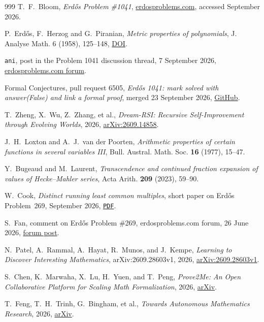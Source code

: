 \documentclass[10pt]{article}
\newcommand{\repobase}{https://github.com/wcook04/plectis-erdos}
\newcommand{\repolink}[2]{\href{\repobase/blob/992cf60a27efd8c34f437e347c413bb781d75c32/#1}{\texttt{#2}}}
\begin{document}
\begin{thebibliography}{999}
 T.~F.~Bloom, \emph{Erd\H{o}s Problem \#1041},
\href{https://www.erdosproblems.com/1041}{erdosproblems.com}, accessed
September 2026.

 P.~Erd\H{o}s, F.~Herzog and G.~Piranian, \emph{Metric
properties of polynomials}, J. Analyse Math. 6 (1958), 125--148,
\href{https://doi.org/10.1007/BF02790232}{DOI}.

 \texttt{ani}, post in the Problem 1041 discussion thread,
7 September 2026,
\href{https://www.erdosproblems.com/forum/thread/1041\#post-8861}{erdosproblems.com forum}.

 Formal Conjectures, pull request 6505, \emph{Erd\H{o}s 1041:
mark solved with answer(False) and link a formal proof}, merged 23 September
2026, \href{https://github.com/google-deepmind/formal-conjectures/pull/6505}{GitHub}.

 T.~Zheng, X.~Wu, Z.~Zhang, et al., \emph{Dream-RSI:
Recursive Self-Improvement through Evolving Worlds}, 2026,
\href{https://arxiv.org/abs/2609.14858}{arXiv:2609.14858}.

 J.~H.~Loxton and A.~J.~van der Poorten, \emph{Arithmetic
properties of certain functions in several variables III}, Bull. Austral.
Math. Soc. \textbf{16} (1977), 15--47.

 Y.~Bugeaud and M.~Laurent, \emph{Transcendence and
continued fraction expansion of values of Hecke--Mahler series}, Acta Arith.
\textbf{209} (2023), 59--90.

 W.~Cook, \emph{Distinct running least common multiples}, short paper on
Erd\H{o}s Problem~269, September 2026,
\repolink{paper/269/erdos-269-three-prime-running-lcm.pdf}{PDF}.

 S.~Fan, comment on Erd\H{o}s Problem \#269, erdosproblems.com
forum, 26 June 2026,
\href{https://www.erdosproblems.com/forum/thread/269\#post-7218}{forum post}.

 N.~Patel, A.~Rammal, A.~Hayat, R.~Munos, and J.~Kempe,
\emph{Learning to Discover Interesting Mathematics}, arXiv:2609.28603v1,
2026, \href{https://arxiv.org/abs/2609.28603v1}{arXiv:2609.28603v1}.

 S.~Chen, K.~Marwaha, X.~Lu, H.~Yuen, and T.~Peng,
\emph{Prove2Me: An Open Collaborative Platform for Scaling Math
Formalization}, 2026, \href{https://doi.org/10.48550/arXiv.2608.28433}{arXiv}.

 T.~Feng, T.~H.~Trinh, G.~Bingham, et al.,
\emph{Towards Autonomous Mathematics Research}, 2026,
\href{https://doi.org/10.48550/arXiv.2602.10177}{arXiv}.


\end{thebibliography}
\end{document}
